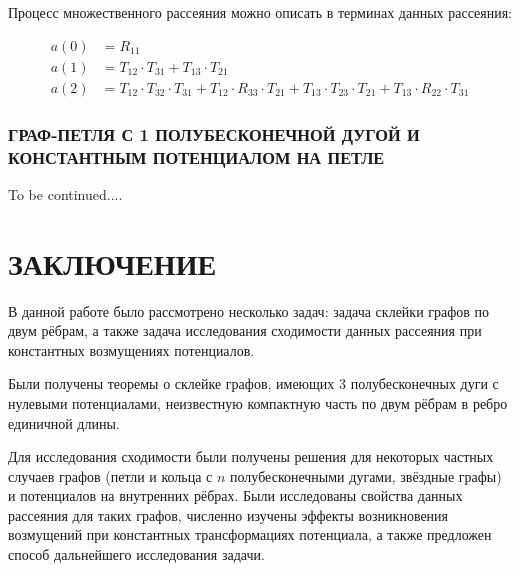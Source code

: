 \documentclass[a4 paper, 12 pt]{extarticle}
\begin{document}
   Процесс множественного рассеяния можно описать в терминах данных рассеяния:
   
   \[
   \begin{aligned}
   a(0) &= R_{11} \\
   a(1) &= T_{12}\cdot T_{31} + T_{13}\cdot T_{21} \\
   a(2) &= T_{12}\cdot T_{32}\cdot T_{31} + T_{12} \cdot R_{33} \cdot T_{21} + T_{13} \cdot T_{23} \cdot T_{21} + T_{13} \cdot R_{22} \cdot T_{31}
   \end{aligned}\]
   
   \subsubsection{ГРАФ-ПЕТЛЯ С 1 ПОЛУБЕСКОНЕЧНОЙ ДУГОЙ И КОНСТАНТНЫМ ПОТЕНЦИАЛОМ НА ПЕТЛЕ}
   
   To be continued....
   
   
   \newpage
   \section{ЗАКЛЮЧЕНИЕ}
   
   В данной работе было рассмотрено несколько задач: задача склейки графов по двум рёбрам, а также задача исследования сходимости данных рассеяния при константных возмущениях потенциалов.
   
   Были получены теоремы о склейке графов, имеющих 3 полубесконечных дуги с нулевыми потенциалами, неизвестную компактную часть по двум рёбрам в ребро единичной длины. 
   
   Для исследования сходимости были получены решения для некоторых частных случаев графов (петли и кольца с $n$ полубесконечными дугами, звёздные графы) и потенциалов на внутренних рёбрах. Были исследованы свойства данных рассеяния для таких графов, численно изучены эффекты возникновения возмущений при константных трансформациях потенциала, а также предложен способ дальнейшего исследования задачи.

  
   
\end{document}
